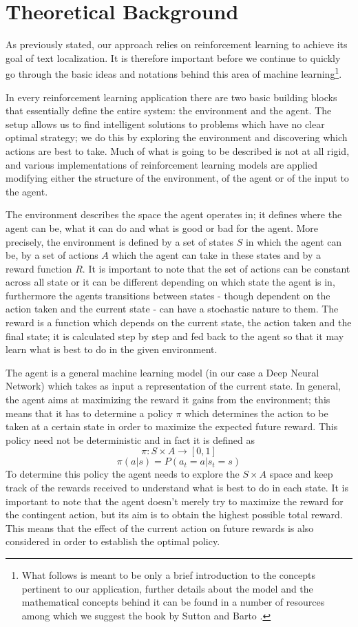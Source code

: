 \section{Theoretical Background}\label{sec:theoretical background}

As previously stated, our approach relies on reinforcement learning to achieve its goal of text localization. It is therefore important before we continue to quickly go through the basic ideas and notations behind this area of machine learning\footnote{What follows is meant to be only a brief introduction to the concepts pertinent to our application,  further details about the model and the mathematical concepts behind it can be found in a number of resources among which we suggest the book by Sutton and Barto \cite{Sutton:1998:IRL:551283}.}.

In every reinforcement learning application there are two basic building blocks that essentially define the entire system: the environment and the agent. The setup allows us to find intelligent solutions to problems which have no clear optimal strategy; we do this by exploring the environment and discovering which actions are best to take. Much of what is going to be described is not at all rigid, and various implementations of reinforcement learning models are applied modifying either the structure of the environment, of the agent or of the input to the agent.

The environment describes the space the agent operates in; it defines where the agent can be, what it can do and what is good or bad for the agent. More precisely, the environment is defined by a set of states $S$ in which the agent can be, by a set of actions $A$ which the agent can take in these states and by a reward function $R$. It is important to note that the set of actions can be constant across all state or it can be different depending on which state the agent is in, furthermore the agents transitions between states - though dependent on the action taken and the current state - can have a stochastic nature to them. The reward is a function which depends on the current state, the action taken and the final state; it is calculated step by step and fed back to the agent so that it may learn what is best to do in the given environment.

The agent is a general machine learning model (in our case a Deep Neural Network) which takes as input a representation of the current state. In general, the agent aims at maximizing the reward it gains from the environment; this means that it has to determine a policy $\pi$ which determines the action to be taken at a certain state in order to maximize the expected future reward. This policy need not be deterministic and in fact it is defined as 
$$\pi: S \times A \to [0,1]$$
$$\pi(a|s) = P(a_t = a|s_t =s)$$
To determine this policy the agent needs to explore the $S \times A$ space and keep track of the rewards received to understand what is best to do in each state. It is important to note that the agent doesn't merely try to maximize the reward for the contingent action, but its aim is to obtain the highest possible total reward. This means that the effect of the current action on future rewards is also considered in order to establish the optimal policy.



